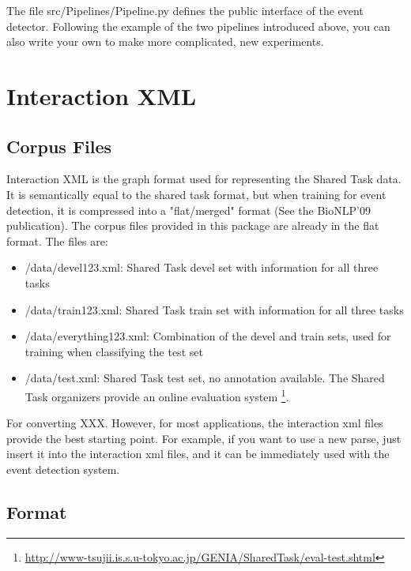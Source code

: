 \documentclass[a4paper,12pt]{article}
\begin{document}
The file src/Pipelines/Pipeline.py defines the public interface of the event
detector. Following the example of the two pipelines introduced above, you can
also write your own to make more complicated, new experiments.

\section{Interaction XML}

\subsection{Corpus Files}

Interaction XML is the graph format used for representing the Shared Task data.
It is semantically equal to the shared task format, but when training for event
detection, it is compressed into a "flat/merged" format (See the BioNLP'09
publication). The corpus files provided in this package are already in the flat
format. The files are:

\begin{itemize}
\item /data/devel123.xml: Shared Task devel set with information for all three tasks

\item /data/train123.xml: Shared Task train set with information for all three
tasks 

\item /data/everything123.xml: Combination of the devel and train sets, used
for training when classifying the test set

\item /data/test.xml: Shared Task test set, no annotation available. The Shared
Task organizers provide an online evaluation system
\footnote{\url{http://www-tsujii.is.s.u-tokyo.ac.jp/GENIA/SharedTask/eval-test.shtml}}.

\end{itemize}

For converting XXX.
However, for most applications, the interaction xml files provide the best
starting point. For example, if you want to use a new parse, just insert it into
the interaction xml files, and it can be immediately used with the event
detection system.

\subsection{Format}
\end{document}
